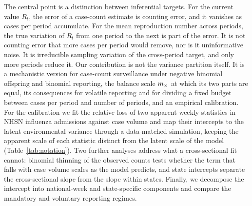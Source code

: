 The central point is a distinction between inferential targets. For the current value $R_t$, the error of a case-count estimate is counting error, and it vanishes as cases per period accumulate. For the mean reproduction number across periods, the true variation of $R_t$ from one period to the next is part of the error. It is not counting error that more cases per period would remove, nor is it uninformative noise. It is irreducible sampling variation of the cross-period target, and only more periods reduce it. Our contribution is not the variance partition itself. It is a mechanistic version for case-count surveillance under negative binomial offspring and binomial reporting, the balance scale $m_{\times}$ at which its two parts are equal, its consequences for volatile reporting and for dividing a fixed budget between cases per period and number of periods, and an empirical calibration. For the calibration we fit the relative loss of two apparent weekly statistics in NHSN influenza admissions against case volume and map their intercepts to the latent environmental variance through a data-matched simulation, keeping the apparent scale of each statistic distinct from the latent scale of the model (Table~\ref{tab:notation}). Two further analyses address what a cross-sectional fit cannot: binomial thinning of the observed counts tests whether the term that falls with case volume scales as the model predicts, and state intercepts separate the cross-sectional slope from the slope within states. Finally, we decompose the intercept into national-week and state-specific components and compare the mandatory and voluntary reporting regimes.
